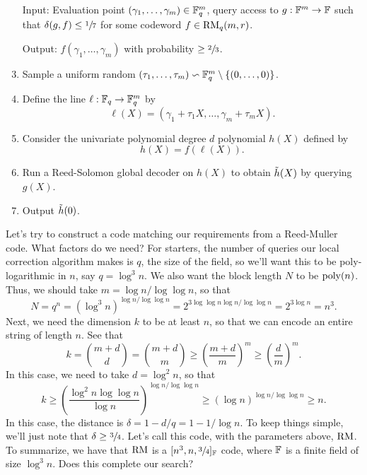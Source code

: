 \documentclass[11pt]{article}
\begin{document}
\begin{enumerate}
    \item[Input:] Evaluation point $(\gamma_1, \ldots, \gamma_m) \in \mathbb{F}_q^m$, query access to $g : \mathbb{F}^m \rightarrow \mathbb{F}$ such that $\delta(g, f) \leq \sfrac{1}{7}$ for some codeword $f \in \mathrm{RM}_q(m, r)$.
    \item[Output:] $f(\gamma_1, \ldots, \gamma_m)$ with probability $\geq \sfrac{2}{3}$.
    \item Sample a uniform random $(\tau_1, \ldots, \tau_m) \backsim \mathbb{F}_q^m \setminus \{(0, \ldots, 0)\}$.
    \item Define the line $\ell : \mathbb{F}_q \rightarrow \mathbb{F}_q^m$ by
    \begin{equation*}
        \ell(X) = \left(\gamma_1 + \tau_1 X, \ldots, \gamma_m + \tau_m X\right).
    \end{equation*}
    \item Consider the univariate polynomial degree $d$ polynomial $h(X)$ defined by 
    \begin{equation*}
        h(X) = f(\ell(X)).
    \end{equation*}
    \item Run a Reed-Solomon global decoder on $h(X)$ to obtain $\Tilde{h}(X)$ by querying $g(X)$.
    \item Output $\Tilde{h}(0)$.
\end{enumerate}
Let's try to construct a code matching our requirements from a Reed-Muller code. What factors do we need? For starters, the number of queries our local correction algorithm makes is $q$, the size of the field, so we'll want this to be poly-logarithmic in $n$, say $q = \log^3 n$. We also want the block length $N$ to be $\mathrm{poly}(n)$. Thus, we should take $m = \log n / \log \log n$, so that 
\begin{equation*}
    N = q^n = \left(\log^3 n\right)^{\log n / \log \log n} = 2^{3\log \log n \log n / \log \log n} = 2^{3\log n} = n^3.
\end{equation*}
Next, we need the dimension $k$ to be at least $n$, so that we can encode an entire string of length $n$. See that 
\begin{equation*}
    k = \binom{m + d}{d} = \binom{m + d}{m} \geq \left(\frac{m + d}{m}\right)^{m} \geq \left(\frac{d}{m}\right)^{m}.
\end{equation*}
In this case, we need to take $d = \log^2 n$, so that 
\begin{equation*}
    k \geq \left(\frac{\log^2 n \log \log n}{\log n}\right)^{\log n / \log \log n} \geq \left(\log n\right)^{\log n / \log \log n} \geq n.
\end{equation*}
In this case, the distance is $\delta = 1 - d / q = 1 - 1 / \log n$. To keep things simple, we'll just note that $\delta \geq \sfrac{3}{4}$. Let's call this code, with the parameters above, $\mathrm{RM}$. To summarize, we have that $\mathrm{RM}$ is a $[n^3, n, \sfrac{3}{4}]_{\mathbb{F}}$ code, where $\mathbb{F}$ is a finite field of size $\log^3 n$. Does this complete our search?
\end{document}
